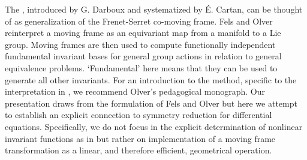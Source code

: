 
The \mframes, introduced by G. Darboux and systematized by
\'E. Cartan, can be thought of as generalization
of the Frenet-Serret co-moving frame.
Fels and Olver reinterpret a moving 
frame as an equivariant map from a manifold to a Lie group.
Moving frames are then used to compute functionally independent
fundamental invariant bases for general group actions in relation
to general equivalence problems. `Fundamental' here means that 
they can be used to generate all other invariants. For an 
introduction to the method, specific to the interpretation
in , we recommend Olver's 
pedagogical monograph. Our presentation draws
from the formulation of Fels and Olver but here we attempt
to establish an explicit connection to symmetry reduction for
differential equations. Specifically, we do not 
focus in the explicit determination of nonlinear invariant functions
as in \refref{FelsOlver98,FelsOlver99} but rather on implementation
of a moving frame transformation as a linear, and therefore 
efficient, geometrical operation. 

